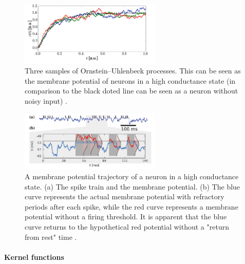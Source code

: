 \begin{figure}
	\centering
    	\includegraphics[width=0.6\textwidth]{imgs/orn_uhl_process.png} 
    \caption[Three samples of Ornstein–Uhlenbeck processes.]{Three samples of Ornstein–Uhlenbeck processes. This can be seen as the membrane potential of neurons in a high conductance state (in comparison to the black doted line can be seen as a neuron without noisy input) \cite{Petrovici2016}.}
	\label{fig:ornuhl}
\end{figure}


\begin{figure}
	\centering
    	\includegraphics[width=0.6\textwidth]{imgs/hcs.png} 
    \caption[A membrane potential trajectory of a neuron in a high conductance state.]{A membrane potential trajectory of a neuron in a high conductance state. (a) The spike train and the membrane potential. (b) The blue curve represents the actual membrane potential with refractory periods after each spike, while the red curve represents a membrane potential without a firing threshold. It is apparent that the blue curve returns to the hypothetical red potential without a "return from rest" time  \cite{Petrovici2016}. }
	\label{fig:hcs}
\end{figure}


\paragraph{Kernel functions} \label{c:pspkernel}

